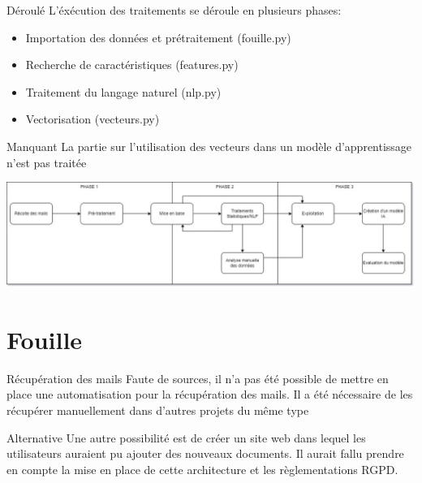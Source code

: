 \documentclass[xelatex,11pt, xcolor=dvipsnames]{beamer}
\begin{document}
\begin{frame}{Déroulé}
	L'éxécution des traitements se déroule en plusieurs phases:
	\begin{itemize}
		\item Importation des données et prétraitement (fouille.py)
		\item Recherche de caractéristiques (features.py)
		\item Traitement du langage naturel (nlp.py)
		\item Vectorisation (vecteurs.py)
	\end{itemize}

	\begin{block}{Manquant}
		La partie sur l'utilisation des vecteurs dans un modèle d'apprentissage n'est pas traitée
	\end{block}
\end{frame}

\begin{frame}
	\includegraphics[width=\linewidth]{img/SchemaGeneral}
\end{frame}

\section{Fouille}
\begin{frame}{Récupération des mails}
	Faute de sources, il n'a pas été possible de mettre en place une automatisation pour la récupération des mails.
	Il a été nécessaire de les récupérer manuellement dans d'autres projets du même type
	\begin{block}{Alternative}
		Une autre possibilité est de créer un site web dans lequel les utilisateurs auraient pu ajouter des nouveaux documents.
		Il aurait fallu prendre en compte la mise en place de cette architecture et les règlementations RGPD\@.
	\end{block}
\end{frame}
\end{document}
